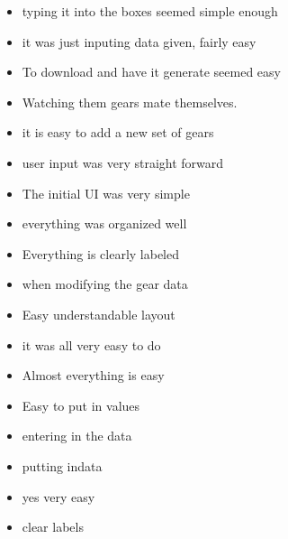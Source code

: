 \begin{itemize}
    \item typing it into the boxes seemed simple enough
    \item it was just inputing data given, fairly easy
    \item To download and have it generate seemed easy
    \item Watching them gears mate themselves.
    \item it is easy to add a new set of gears
    \item user input was very straight forward
    \item The initial UI was very simple
    \item everything was organized well
    \item Everything is clearly labeled
    \item when modifying the gear data
    \item Easy understandable layout
    \item it was all very easy to do
    \item Almost everything is easy
    \item Easy to put in values
    \item entering in the data
    \item putting indata
    \item yes very easy
    \item clear labels
\end{itemize}

